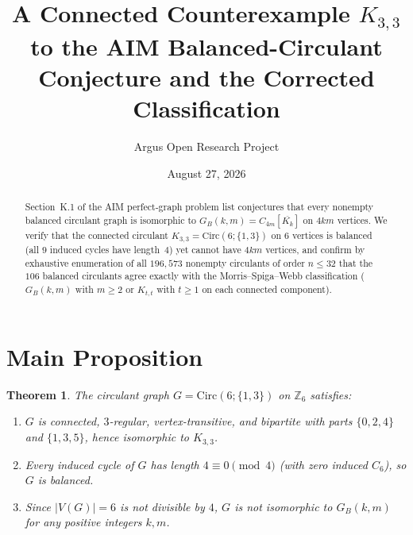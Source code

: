 \documentclass[10pt,reqno]{amsart}
\title[The Balanced Circulant $K_{3,3}$ and the Corrected $G_B(k,m)$ Classification]
{A Connected Counterexample $K_{3,3}$ to the AIM Balanced-Circulant Conjecture and the Corrected Classification}
\author{Argus Open Research Project}
\date{August 27, 2026}
\newtheorem{theorem}{Theorem}[section]
\theoremstyle{definition}
\begin{document}
\begin{abstract}
Section~K.1 of the AIM perfect-graph problem list conjectures that every nonempty balanced circulant graph is isomorphic to $G_B(k,m)=C_{4m}[\overline{K_k}]$ on $4km$ vertices. We verify that the connected circulant $K_{3,3}=\mathrm{Circ}(6;\{1,3\})$ on $6$ vertices is balanced (all $9$ induced cycles have length~$4$) yet cannot have $4km$ vertices, and confirm by exhaustive enumeration of all $196{,}573$ nonempty circulants of order $n\le 32$ that the $106$ balanced circulants agree exactly with the Morris--Spiga--Webb classification ($G_B(k,m)$ with $m\ge 2$ or $K_{t,t}$ with $t\ge 1$ on each connected component).
\end{abstract}
\maketitle
\section{Main Proposition}
\begin{theorem}
The circulant graph $G = \mathrm{Circ}(6;\{1,3\})$ on $\mathbb{Z}_6$ satisfies:
\begin{enumerate}[label=\textup{(\arabic*)}]
  \item $G$ is connected, $3$-regular, vertex-transitive, and bipartite with parts $\{0,2,4\}$ and $\{1,3,5\}$, hence isomorphic to $K_{3,3}$.
  \item Every induced cycle of $G$ has length $4\equiv 0\pmod 4$ (with zero induced $C_6$), so $G$ is balanced.
  \item Since $|V(G)|=6$ is not divisible by $4$, $G$ is not isomorphic to $G_B(k,m)$ for any positive integers $k,m$.
\end{enumerate}
\end{theorem}
\end{document}

